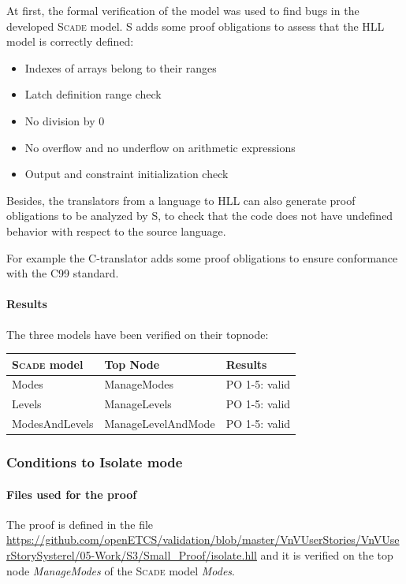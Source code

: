 \documentclass{article}
\newcommand{\smartsolver}{\mbox{S\textsmaller[1]{3}}\xspace}
\newcommand{\HLL}{{HLL}}
\newcommand{\SCADE}{\textsc{Scade}}
\begin{document}
At first, the formal verification of the model was used to find bugs in the developed
\SCADE{} model.
\smartsolver{} adds some proof obligations to assess that the \HLL{}
model is correctly defined:
\begin{itemize}
\item Indexes of arrays belong to their ranges
\item Latch definition range check
\item No division by 0
\item No overflow and no underflow on arithmetic expressions
\item Output and constraint initialization check
\end{itemize}

Besides, the translators from a language to \HLL{} can also generate proof obligations to be analyzed by \smartsolver{},
to check that the code does not have undefined behavior with respect to the source language.

For example the C-translator adds some proof obligations to ensure conformance with the C99 standard.


\paragraph{Results}
The three models have been verified on their topnode:

\begin{tabular}{|l|l|l|}
\hline
\textbf{\SCADE{} model} & \textbf{Top Node} & \textbf{Results}  \\ \hline
Modes & ManageModes &  PO 1-5: valid \\
Levels & ManageLevels &  PO 1-5: valid \\
ModesAndLevels & ManageLevelAndMode & PO 1-5: valid \\
\hline
\end{tabular}

\subsubsection{Conditions to Isolate mode}
\label{sec:isolate}

\paragraph{Files used for the proof} The proof is defined in the file \url{https://github.com/openETCS/validation/blob/master/VnVUserStories/VnVUserStorySysterel/05-Work/S3/Small_Proof/isolate.hll} and it is verified on the top node \emph{ManageModes} of the \SCADE{} model \emph{Modes}.
\end{document}
